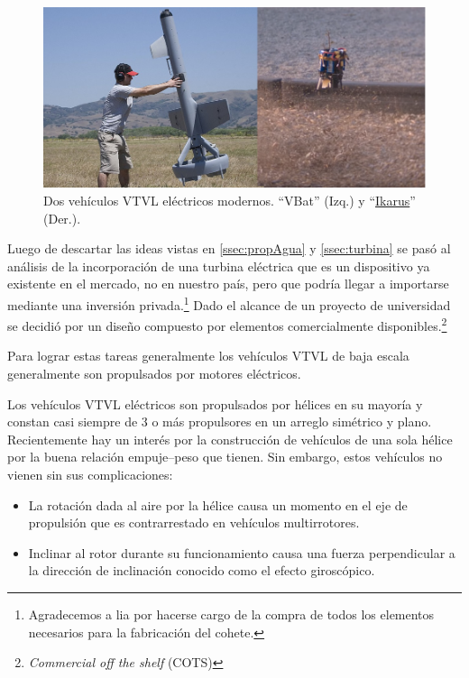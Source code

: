 \begin{figure}[htb]
    \centering
    \includegraphics[width=0.8\linewidth]{fig/vbat_icarus.png}
    \caption{Dos vehículos VTVL eléctricos modernos. ``VBat'' (Izq.) y ``\href{https://hackaday.com/2018/08/31/single-rotor-drone-a-thrust-vectoring-monocopter/}{Ikarus}'' (Der.).}
    \label{fig:vbat_icarus}
\end{figure}

Luego de descartar las ideas vistas en \ref{ssec:propAgua} y \ref{ssec:turbina} se pasó al análisis de la incorporación de una turbina eléctrica que es un dispositivo ya existente en el mercado, no en nuestro país, pero que podría llegar a importarse mediante una
inversión privada.\footnote{Agradecemos a \gls{lia} por hacerse cargo de la compra de todos los elementos necesarios para la fabricación del cohete.} Dado el alcance de un proyecto de universidad se decidió por un diseño compuesto por elementos comercialmente disponibles.\footnote{\textit{Commercial off the shelf} (COTS)}


\medskip


Para lograr estas tareas generalmente los vehículos VTVL de baja escala generalmente son propulsados por motores eléctricos.

\medskip

Los vehículos VTVL eléctricos son propulsados por hélices en su mayoría y constan casi siempre de 3 o más propulsores en un arreglo simétrico y plano. Recientemente hay un interés por la construcción de vehículos de una sola hélice por la buena relación empuje--peso que tienen. Sin embargo, estos vehículos no vienen sin sus complicaciones: 

\begin{itemize}
    \item La rotación dada al aire por la hélice causa un momento en el eje de propulsión que es contrarrestado en vehículos multirrotores.
    \item Inclinar al rotor durante su funcionamiento causa una fuerza perpendicular a la dirección de inclinación conocido como el efecto giroscópico. 
\end{itemize}

